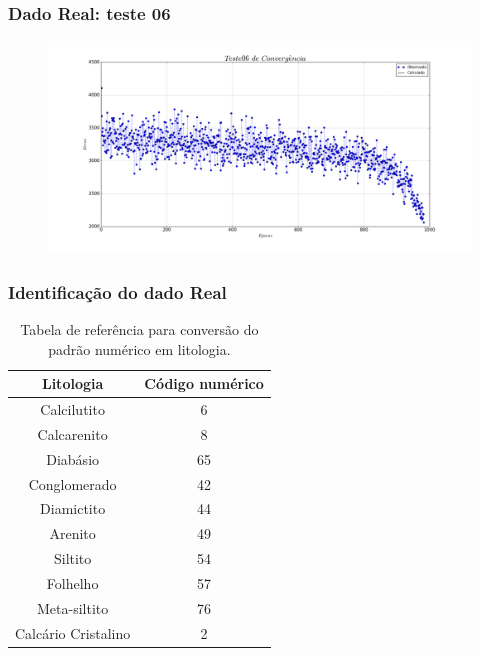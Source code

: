 \documentclass[aspectratio=10]{beamer} %
\begin{document}
\begin{frame}
	\frametitle{Dado Real: teste 06}
	\begin{figure}[H]
		\centering
		\includegraphics[scale=0.2]{Imagens/conv06.png}
	\end{figure} 
\end{frame}

\begin{frame}
	\frametitle{Identificação do dado Real}
	\begin{table}[H]
		\centering
		\begin{tabular}{c|c}
			
			Litologia                    & Código numérico \\ %
			\hline                                                             %
			Calcilutito                   &  6              \\
			Calcarenito  		          &  8              \\
			Diabásio    	              &  65              \\
			Conglomerado                  &  42              \\
			Diamictito                    &  44              \\
			Arenito                       &  49              \\
			Siltito                       &  54              \\
			Folhelho                      &  57              \\
			Meta-siltito                  &  76              \\
			Calcário Cristalino           &  2              \\
			
		\end{tabular}
		\label{codigosreal}
		\caption{Tabela de referência para conversão do padrão numérico em litologia.}
	\end{table}
\end{frame}
\end{document}
